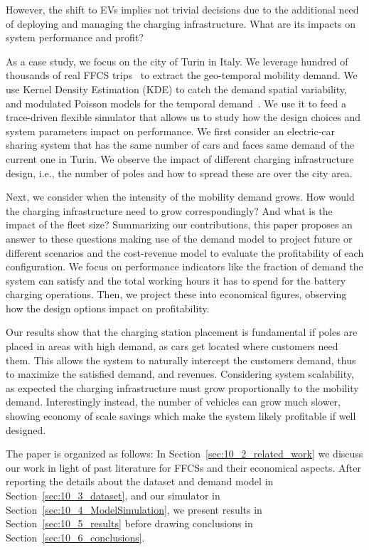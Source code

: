 However, the shift to EVs implies not trivial decisions due to the additional need of deploying and managing the charging infrastructure. What are its impacts on system performance and profit?

As a case study, we focus on the city of Turin in Italy. 
We leverage hundred of thousands of real FFCS trips~\cite{10_ciociola2017umap} to extract the geo-temporal mobility demand. We use Kernel Density Estimation (KDE) to catch the demand spatial variability, and modulated Poisson models for the temporal demand~\cite{ciociola2020}. 
We use it to feed a trace-driven flexible simulator that allows us to study how the design choices and system parameters impact on performance. We first consider an electric-car sharing system that has the same number of cars and faces same demand of the current one in Turin. We observe the impact of different charging infrastructure design, i.e., the number of poles and how to spread these are over the city area. 

Next, we consider when the intensity of the mobility demand grows. How would the charging infrastructure need to grow correspondingly? And what is the impact of the fleet size? 
Summarizing our contributions, this paper proposes an answer to these questions making use of the demand model to project future or different scenarios and the cost-revenue model to evaluate the profitability of each configuration.
We focus on performance indicators like the fraction of demand the system can satisfy and the total working hours it has to spend for the battery charging operations. 
Then, we project these into economical figures, observing how the design options impact on profitability. 


Our results show that the charging station placement is fundamental if poles are placed in areas with high demand, as cars get located where customers need them. This allows the system to naturally intercept the customers demand, thus to maximize the satisfied demand, and revenues.
Considering system scalability, as expected the charging infrastructure must grow proportionally to the mobility demand. Interestingly instead, the number of vehicles can grow much slower, showing economy of scale savings which make the system likely profitable if well designed.

The paper is organized as follows: In Section~\ref{sec:10_2_related_work} we discuss our work in light of past literature for FFCSs and their economical aspects. After reporting the details about the dataset and demand model in  Section~\ref{sec:10_3_dataset}, and our simulator in Section~\ref{sec:10_4_ModelSimulation}, we present results in Section~\ref{sec:10_5_results} before drawing conclusions in Section~\ref{sec:10_6_conclusions}.


